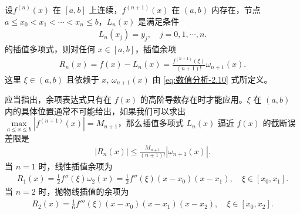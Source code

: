 \documentclass[../../main.tex]{subfiles}%
\begin{document}
\begin{theorem}\label{theorem:Lagrange插值多项式的Lagrange插值余项}
设$f^{(n)}(x)$ 在 $[a, b]$ 上连续，$f^{(n + 1)}(x)$ 在 $(a, b)$ 内存在，节点 $a \leqslant x_0 < x_1 < \cdots < x_n \leqslant b$，$L_n(x)$ 是满足条件 
\begin{align*}
L_n(x_j) = y_j, \quad j = 0, 1, \cdots, n.
\end{align*}
的插值多项式，则对任何 $x \in [a, b]$，插值余项 
\begin{align}
R_n(x) = f(x) - L_n(x) = \frac{f^{(n + 1)}(\xi)}{(n + 1)!} \omega_{n + 1}(x). \label{eq:数值分析-2.12}
\end{align}
这里 $\xi \in (a, b)$ 且依赖于 $x$,$\,\,\omega_{n + 1}(x)$ 由 \eqref{eq:数值分析-2.10} 式所定义。
\end{theorem}
\begin{remark}
应当指出，余项表达式只有在 $f(x)$ 的高阶导数存在时才能应用。$\xi$ 在 $(a, b)$ 内的具体位置通常不可能给出，如果我们可以求出 $\max\limits_{a \leqslant x \leqslant b} | f^{(n + 1)}(x) | = M_{n + 1}$，那么插值多项式 $L_n(x)$ 逼近 $f(x)$ 的截断误差限是
\begin{align}
| R_n(x) | \leqslant \frac{M_{n + 1}}{(n + 1)!} | \omega_{n + 1}(x) | .\label{eq:数值分析-2.14}
\end{align}
当 $n = 1$ 时，线性插值余项为 
\begin{align}
R_1(x) = \frac{1}{2} f''(\xi) \omega_2(x) = \frac{1}{2} f''(\xi)(x - x_0)(x - x_1), \quad \xi \in [x_0, x_1] .\label{eq:数值分析-2.15}
\end{align}
当 $n = 2$ 时，抛物线插值的余项为 
\begin{align}
R_2(x) = \frac{1}{6} f'''(\xi)(x - x_0)(x - x_1)(x - x_2), \quad \xi \in [x_0, x_2].\label{eq:数值分析-2.16}
\end{align}
\end{remark}
\end{document}
